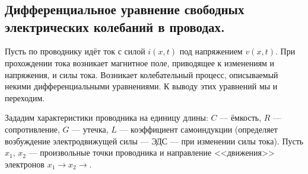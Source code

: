 \chapter{}
\label{lecture14}
\section[Телеграфные уравнения.]{Дифференциальное уравнение свободных электрических колебаний в проводах.}
\label{lecture14section1}
Пусть по проводнику идёт ток с силой $i(x,t)$ под напряжением $v(x,t)$. При прохождении тока возникает магнитное поле, приводящее к изменениям и напряжения, и силы тока. Возникает колебательный процесс, описываемый некими дифференциальными уравнениями. К выводу этих уравнений мы и переходим. 

Зададим характеристики проводника на единицу длины: $C$ --- ёмкость, $R$ --- сопротивление, $G$ --- утечка, $L$ --- коэффициент самоиндукции (определяет возбуждение электродвижущей силы --- ЭДС --- при изменении силы тока). Пусть $x_1$, $x_2$ --- произвольные точки проводника и направление <<движения>> электронов $x_1\to x_2\to$. 
\vspace{0.2cm}



\vspace{0.2cm}

